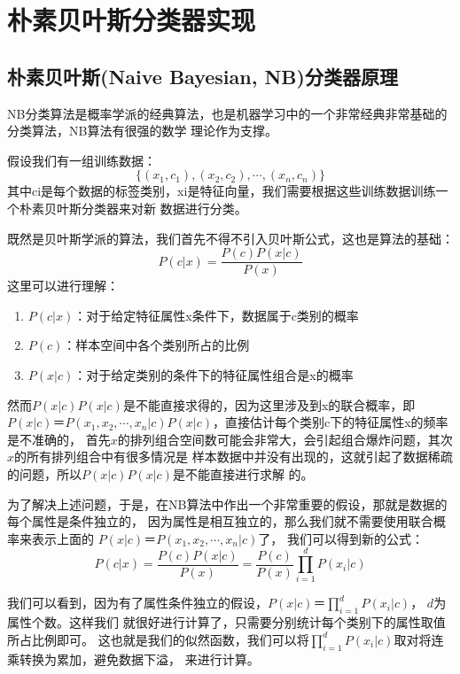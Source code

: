 \section{朴素贝叶斯分类器实现}
\subsection{朴素贝叶斯(Naive Bayesian, NB)分类器原理}
NB分类算法是概率学派的经典算法，也是机器学习中的一个非常经典非常基础的分类算法，NB算法有很强的数学
理论作为支撑。

假设我们有一组训练数据：
$$\{(x_1,c_1),(x_2,c_2),\cdots,(x_n,c_n)\}$$
其中ci是每个数据的标签类别，xi是特征向量，我们需要根据这些训练数据训练一个朴素贝叶斯分类器来对新
数据进行分类。

既然是贝叶斯学派的算法，我们首先不得不引入贝叶斯公式，这也是算法的基础：
\begin{equation}
  \label{eq:bayesBase}
  P(c|x)=\frac{P(c)P(x|c)}{P(x)}
\end{equation}
这里可以进行理解： 
\begin{enumerate}
  \item $P(c|x)$：对于给定特征属性x条件下，数据属于c类别的概率
  \item $P(c)$：样本空间中各个类别所占的比例
  \item $P(x|c)$：对于给定类别的条件下的特征属性组合是x的概率
\end{enumerate}

然而$P(x|c)P(x|c)$是不能直接求得的，因为这里涉及到x的联合概率，即$P(x|c)＝P(x_1,x_2,\cdots,x_n|c)P(x|c)$，直接估计每个类别c下的特征属性x的频率是不准确的，
首先$x$的排列组合空间数可能会非常大，会引起组合爆炸问题，其次$x$的所有排列组合中有很多情况是
样本数据中并没有出现的，这就引起了数据稀疏的问题，所以$P(x|c)P(x|c)$是不能直接进行求解
的。

为了解决上述问题，于是，在NB算法中作出一个非常重要的假设，那就是数据的每个属性是条件独立的，
因为属性是相互独立的，那么我们就不需要使用联合概率来表示上面的
$P(x|c)＝P(x_1,x_2,\cdots,x_n|c)$了，
我们可以得到新的公式：
\begin{equation}
  \label{eq:bayesBaseNew}
  P(c|x)=\frac{P(c)P(x|c)}{P(x)}=\frac{P(c)}{P(x)}\prod_{i=1}^d P(x_i|c)
\end{equation}

我们可以看到，因为有了属性条件独立的假设，$P(x|c)＝\prod_{i=1}^d P(x_i|c)$，
$d$为属性个数。这样我们 就很好进行计算了，只需要分别统计每个类别下的属性取值所占比例即可。
这也就是我们的似然函数，我们可以将$\prod_{i=1}^d P(x_i|c)$取对将连乘转换为累加，避免数据下溢，
来进行计算。

